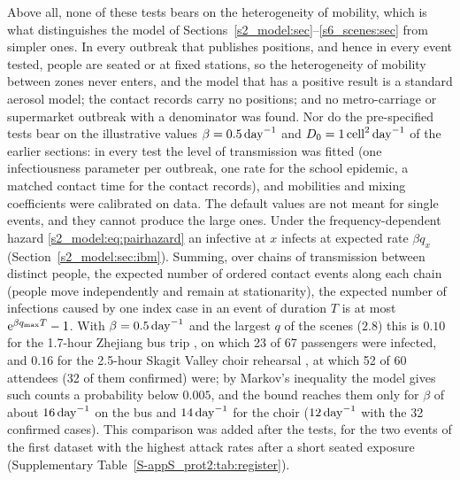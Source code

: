 Above all, none of these tests bears on the heterogeneity of mobility, which is what distinguishes the model of
Sections~\ref{s2_model:sec}--\ref{s6_scenes:sec} from simpler ones. In every outbreak that publishes positions,
and hence in every event tested, people are seated or at fixed stations, so the heterogeneity of mobility between
zones never enters, and the model that has a positive result is a standard aerosol model; the contact records
carry no positions; and no metro-carriage or supermarket outbreak with a denominator was found. Nor do the
pre-specified tests bear on the illustrative values $\beta=0.5\,\mathrm{day}^{-1}$ and $D_0=1\,\mathrm{cell}^2\,\mathrm{day}^{-1}$ of the earlier
sections: in every test the level of transmission was fitted (one infectiousness parameter per outbreak, one rate
for the school epidemic, a matched contact time for the contact records), and mobilities and mixing coefficients
were calibrated on data.
The default values are not meant for single events, and they cannot produce the large ones. Under the
frequency-dependent hazard \eqref{s2_model:eq:pairhazard} an infective at $x$ infects at expected rate $\beta q_x$
(Section~\ref{s2_model:sec:ibm}). Summing, over chains of transmission between distinct people, the expected
number of ordered contact events along each chain (people move independently and remain at stationarity), the
expected number of infections caused by one index case in an event of duration $T$ is at most
$\mathrm{e}^{\beta q_{\max} T}-1$. With $\beta=0.5\,\mathrm{day}^{-1}$ and the largest $q$ of the scenes ($2.8$) this is $0.10$ for the
1.7-hour Zhejiang bus trip \citep{shen2020}, on which 23 of 67 passengers were infected, and $0.16$ for the 2.5-hour Skagit Valley
choir rehearsal \citep{hamner2020}, at which 52 of 60 attendees (32 of them confirmed) were; by Markov's
inequality the model gives such counts a probability below $0.005$, and the bound reaches them only for
$\beta$ of about $16\,\mathrm{day}^{-1}$ on the bus and $14\,\mathrm{day}^{-1}$ for the choir ($12\,\mathrm{day}^{-1}$ with the 32 confirmed cases).
This comparison was added after the tests, for the two events of the first dataset with the highest attack rates
after a short seated exposure (Supplementary Table~\ref{S-appS_prot2:tab:register}).

